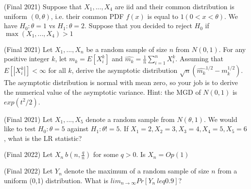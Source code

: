 \documentclass[answers]{exam}
\begin{document}
\begin{questions}
\question (Final 2021) Suppose that $X_1,...,X_4$ are iid and their common distribution is uniform $(0,\theta)$, i.e. their common PDF $f(x)$ is equal to $1(0<x<\theta)$. We have $H_0: \theta = 1$ vs $H_1 : \theta = 2$. Suppose that you decided to reject $H_0$ if $\max(X_1,...,X_4)>1$

\question (Final 2021) Let $X_1,...,X_n$ be a random sample of size $n$ from $N(0,1)$. For any positive integer $k$, let $m_k = E[X_i^k]$ and $\hat{m_k} = \frac{1}{n} \sum_{i=1}^n X_i^k$. Assuming that $E[|X_i^k|] < \infty$ for all $k$, derive the asymptotic distribution $\sqrt{n}(\hat{m_k}^{1/2} - m_k^{1/2})$. The asymptotic distribution is normal with mean zero, so your job is to derive the numerical value of the asymptotic variance. Hint: the MGD of $N(0,1)$ is $exp(t^2/2)$.
\begin{solution}
\end{solution}

\question (Final 2021) Let $X_1,...,X_5$ denote a random sample from $N(\theta,1)$. We would like to test $H_0 : \theta = 5$ against $H_1 : \theta != 5$. If $X_1=2, X_2=3, X_3=4, X_4=5, X_5=6$, what is the LR statistic?
\begin{solution}
\end{solution}

\question (Final 2022) Let $X_n ~ b(n,\frac{q}{n})$ for some $q>0$. Is $X_n = Op(1)$
\begin{solution}
\end{solution}

\question (Final 2022) Let $Y_n$ denote the maximum of a random sample of size $n$ from a uniform (0,1) distribution. What is $lim_{n \to \infty} Pr[Y_n \ leq 0.9]$?
\begin{solution}
\end{solution}


\end{questions}
\end{document}
